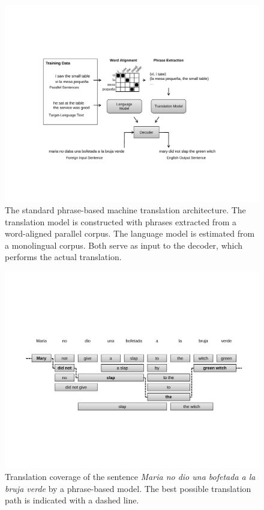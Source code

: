 \begin{figure}[p]
\begin{center}
\includegraphics[scale=0.7]{figures/fig-ch6-MT-arch.pdf}
\vspace{-0.3cm}
\end{center}\caption{The standard phrase-based machine translation architecture.  The translation model is constructed with phrases extracted from a word-aligned parallel corpus.  The language model is estimated from a monolingual corpus.  Both serve as input to the decoder, which performs the actual translation.}\label{chapter6_figure_mtarch}
\end{figure}

\begin{figure}[p]
\begin{center}
\includegraphics[scale=0.6]{figures/fig-ch6-MT-tiles.pdf}
\vspace{-0.3cm}
\end{center}\caption{Translation coverage of the sentence \emph{Maria no dio una bofetada a la bruja verde} by a phrase-based model. The best possible translation path is indicated with a dashed line.}\label{chapter6_figure_mttiles}
\end{figure}

